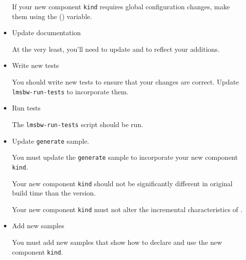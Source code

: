 \begin{itemize}
  If your new component \texttt{kind} requires global configuration
  changes, make them using the \lmsbwconfiguration
  () variable.

\item Update documentation

  At the very least, you'll need to update  and
   to reflect your additions.

\item Write new tests

  You should write new tests to ensure that your changes are correct.
  Update \texttt{lmsbw-run-tests} to incorporate them.

\item Run tests

  The \texttt{lmsbw-run-tests} script should be run.

\item Update \texttt{generate} sample.

  You must update the \texttt{generate} sample to incorporate your
  new component \texttt{kind}.

  Your new component \texttt{kind} should not be significantly
  different in original build time than the \makefile version.

  Your new component \texttt{kind} must not alter the incremental
  characteristics of \lmsbw.

\item Add new samples

  You must add new samples that show how to declare and use the new
  component \texttt{kind}.

\end{itemize}

